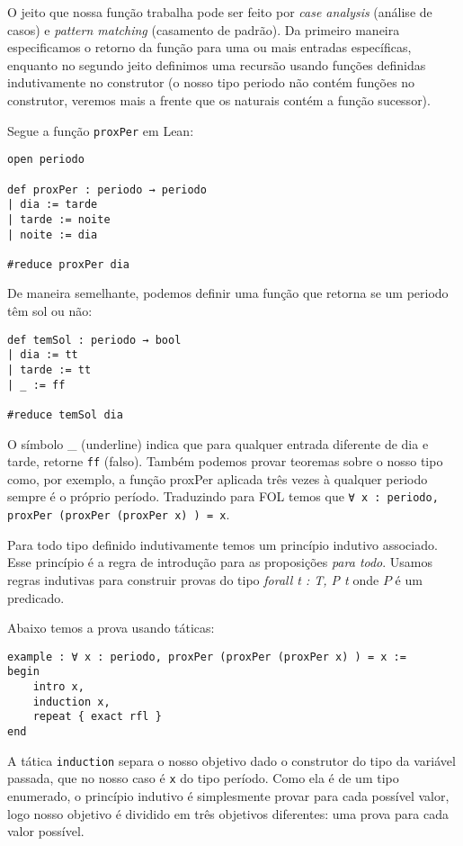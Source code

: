 O jeito que nossa função trabalha pode ser feito por \textit{case analysis} (análise de casos) e \textit{pattern matching} (casamento de padrão). Da primeiro maneira especificamos o retorno da função para uma ou mais entradas específicas, enquanto no segundo jeito definimos uma recursão usando funções definidas indutivamente no construtor (o nosso tipo periodo não contém funções no construtor, veremos mais a frente que os naturais contém a função sucessor).

Segue a função \lstinline{proxPer} em Lean:

\begin{lstlisting}
open periodo

def proxPer : periodo → periodo
| dia := tarde
| tarde := noite
| noite := dia

#reduce proxPer dia
\end{lstlisting}

De maneira semelhante, podemos definir uma função que retorna se um periodo têm sol ou não:

\begin{lstlisting}
def temSol : periodo → bool
| dia := tt
| tarde := tt
| _ := ff

#reduce temSol dia
\end{lstlisting}

O símbolo \_ (underline) indica que para qualquer entrada diferente de dia e tarde, retorne \lstinline{ff} (falso). Também podemos provar teoremas sobre o nosso tipo como, por exemplo, a função proxPer aplicada três vezes à qualquer periodo sempre é o próprio período. Traduzindo para FOL temos que \lstinline{∀ x : periodo, proxPer (proxPer (proxPer x) ) = x}. 

Para todo tipo definido indutivamente temos um princípio indutivo associado. Esse princípio é a regra de introdução para as proposições \textit{para todo}. Usamos regras indutivas para construir provas do tipo \textit{forall t : T, P t} onde $P$ é um predicado.

Abaixo temos a prova usando táticas:

\begin{lstlisting}
example : ∀ x : periodo, proxPer (proxPer (proxPer x) ) = x :=
begin
    intro x,
    induction x,
    repeat { exact rfl }
end
\end{lstlisting}

A tática \lstinline{induction} separa o nosso objetivo dado o construtor do tipo da variável passada, que no nosso caso é \lstinline{x} do tipo período. Como ela é de um tipo enumerado, o princípio indutivo é simplesmente provar para cada possível valor, logo nosso objetivo é dividido em três objetivos diferentes: uma prova para cada valor possível.


